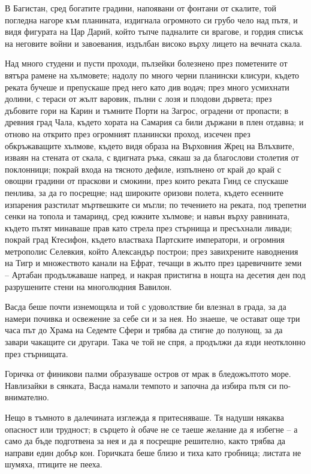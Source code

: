 \documentclass[oneside,10pt]{memoir}
\begin{document}
В Багистан, сред богатите градини, напоявани от фонтани от скалите, той погледна
нагоре към планината, издигнала огромното си грубо чело над пътя, и видя
фигурата на Цар Дарий, който тъпче падналите си врагове, и гордия списък на
неговите войни и завоевания, издълбан високо върху лицето на вечната скала.

Над много студени и пусти проходи, пълзейки болезнено през пометените от вятъра
рамене на хълмовете; надолу по много черни планински клисури, където реката
бучеше и препускаше пред него като див водач; през много усмихнати долини, с
тераси от жълт варовик, пълни с лозя и плодови дървета; през дъбовите гори на
Карин и тъмните Порти на Загрос, оградени от пропасти; в древния град Чала,
където хората на Самария са били държани в плен отдавна; и отново на открито
през огромният планински проход, изсечен през обкръжаващите хълмове, където видя
образа на Върховния Жрец на Влъхвите, изваян на стената от скала, с вдигната
ръка, сякаш за да благослови столетия от поклонници; покрай входа на тясното
дефиле, изпълнено от край до край с овощни градини от праскови и смокини, през
които реката Гинд се спускаше пенлива, за да го посрещне; над широките оризови
полета, където есенните изпарения разстилат мъртвешките си мъгли; по течението
на реката, под трепетни сенки на топола и тамаринд, сред южните хълмове; и навън
върху равнината, където пътят минаваше прав като стрела през стърнища и
пресъхнали ливади; покрай град Ктесифон, където властваха Партските императори,
и огромния метрополис Селевкия, който Александър построи; през завихрените
наводнения на Тигр и множеството канали на Ефрат, течащи в жълто през
царевичните земи -- Артабан продължаваше напред, и накрая пристигна в нощта на
десетия ден под разрушените стени на многолюдния Вавилон.

Васда беше почти изнемощяла и той с удоволствие би влезнал в града, за да намери
почивка и освежение за себе си и за нея. Но знаеше, че остават още три часа път
до Храма на Седемте Сфери и трябва да стигне до полунощ, за да завари чакащите
си другари. Така че той не спря, а продължи да язди неотклонно през
стърнищата.

Горичка от финикови палми образуваше остров от мрак в бледожълтото море.
Навлизайки в сянката, Васда намали темпото и започна да избира пътя си
по-внимателно.

Нещо в тъмното в далечината изглежда я притесняваше. Тя надуши някаква опасност
или трудност; в сърцето ѝ обаче не се таеше желание да я избегне -- а само да
бъде подготвена за нея и да я посрещне решително, както трябва да направи един
добър кон. Горичката беше близо и тиха като гробница; листата не шумяха, птиците
не пееха.
\end{document}
